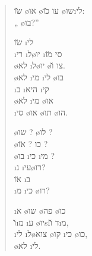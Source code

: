 \begin{verse}
	\u{שו} \o{או} \o{עו} \u{כו} \o{שו}\i{לי}:\\
	„   \o{בו}?”

	\u{שו} \i{לי} \\
	\i{רי} \i{ל}\o{יו}  \i{סי} \u{מו}\\
	 \o{לא} \i{ל}\o{יו}  \o{צו} \u{ו}.\\
	 \o{לא} \i{מי} \i{לי} \o{בו}\\
	 \i{ב} \i{היא} \i{קי} \\
	\o{לא} \i{מי}  \o{או}\\
	\i{סי} \o{או}  \o{תו} \o{הו}.

	\o{שו}  ? \o{לו}  ?\\
	\o{כו}  ? \u{או}   ?\\
	 \o{בו} \i{כי} \i{מי} ?\\
	\i{נ}  \i{עי}\o{רו}?\\
	\u{או} \i{ב} \\
	\i{מ} \i{כי} \o{רו}?

	\i{א} \o{שו} \o{פה} \o{כו}\\
	\u{ו}\i{מ} \i{ע} \o{יו}slד \u{ו}\i{מ},\\
	\i{לי}  \i{ל}\o{צוא}  \o{קו} \i{כי} \o{כו},\\
	\o{לא} \i{לי}.
\end{verse}

